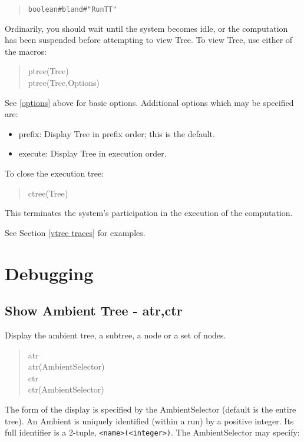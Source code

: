 \begin{verse}
    \verb+boolean#bland#"RunTT"+
\end{verse}

\noindent
Ordinarily, you should wait until the system becomes idle, or the
computation has been suspended before attempting to view Tree.
To view Tree, use either of the macros:

\begin{verse}
    ptree(Tree) \\
    ptree(Tree,Options)
\end{verse}

\noindent
See \ref{options} above for basic options.
Additional options which may be specified are:

\begin{itemize}
\item prefix:   Display Tree in prefix order; this is the default.
\item execute:  Display Tree in execution order.
\end{itemize}

\noindent
To close the execution tree:

\begin{verse}
    ctree(Tree)
\end{verse}

\noindent
This terminates the system's
participation in the execution of the computation.

\noindent
See Section \ref{vtree traces} for examples.

\section{Debugging }

\subsection{Show Ambient Tree - atr,ctr}
\label{xtr}

Display the ambient tree, a subtree, a node or a set of nodes.

\begin{verse}
   atr \\
   atr(AmbientSelector) \\
   ctr \\
   ctr(AmbientSelector)
\end{verse}

\noindent
The form of the display is specified
by the AmbientSelector (default is the entire tree).  An Ambient is
uniquely identified (within a run) by a positive integer.  Its
full identifier is a 2-tuple, \verb+<name>(<integer>)+.  The
AmbientSelector may specify:

